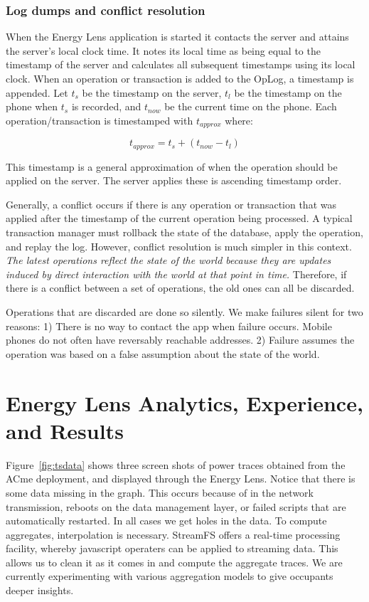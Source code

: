 \subsubsection{Log dumps and conflict resolution}
\label{sec:conflicts}
When the Energy Lens application is started it contacts the server and attains the server's local clock time. 
It notes its local time as being equal to the timestamp of the server and calculates all subsequent timestamps
using its local clock.  When an operation or transaction is added to the OpLog, a timestamp is appended.  Let $t_s$ be the timestamp 
on the server, $t_l$ be the timestamp on the phone when $t_s$ is recorded, and $t_{now}$ be the current time on the phone.  
Each operation/transaction is timestamped with $t_{approx}$ where:

\begin{equation}
t_{approx} = t_s + (t_{now} - t_l)
\end{equation}

This timestamp is a general approximation of when the operation should be applied on the server.  The server applies 
these is ascending timestamp order.

Generally, a conflict occurs if there is any operation or transaction that was applied after the timestamp of the current operation
being processed.  A typical transaction manager must rollback the state of the database, apply the operation, and replay
the log.  However, conflict resolution is much simpler in this context.  \emph{The latest operations reflect the state of the
world because they are updates induced by direct interaction with the world at that point in time.}  Therefore, if there is a conflict
between a set of operations, the old ones can all be discarded.

Operations that are discarded are done so silently.  We make failures silent for two reasons: 1) There is no way to contact the app when 
failure occurs.  Mobile phones
do not often have reversably reachable addresses.  2) Failure assumes the operation was based on a false assumption about the state
of the world.  


\section{Energy Lens Analytics, Experience, and Results}

Figure~\ref{fig:tsdata} shows three screen shots of power traces obtained from the ACme deployment, and displayed
through the Energy Lens.  Notice that there is
some data missing in the graph.  This occurs because of in the network transmission, reboots on the data management layer,
or failed scripts that are automatically restarted.  In all cases we get holes in the data.  To compute aggregates, interpolation 
is necessary.  StreamFS offers a real-time processing facility, whereby javascript operaters can be applied
to streaming data.  This allows us to clean it as it comes in and compute the aggregate traces.  We are currently experimenting
with various aggregation models to give occupants deeper insights.  


